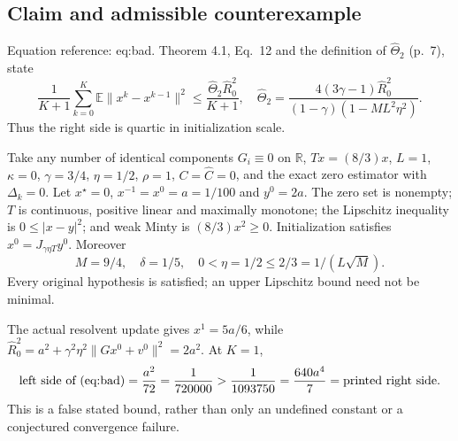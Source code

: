\documentclass[10pt]{article}
\begin{document}
\subsection*{Claim and admissible counterexample}
Equation reference: eq:bad. Theorem 4.1, Eq. 12 and the definition of \(\widehat\Theta_2\) (p. 7), state \[
 \frac1{K+1}\sum_{k=0}^K\mathbb E\|x^k-x^{k-1}\|^2
 \le\frac{\widehat\Theta_2\widehat R_0^2}{K+1},
 \quad
 \widehat\Theta_2=
 \frac{4(3\gamma-1)\widehat R_0^2}
 {(1-\gamma)(1-ML^2\eta^2)}.\] Thus the right side is quartic in initialization scale.\par
Take any number of identical components \(G_i\equiv0\) on \(\mathbb R\), \(Tx=(8/3)x\), \(L=1\), \(\kappa=0\), \(\gamma=3/4\), \(\eta=1/2\), \(\rho=1\), \(C=\widehat C=0\), and the exact zero estimator with \(\Delta_k=0\). Let \(x^\star=0\), \(x^{-1}=x^0=a=1/100\) and \(y^0=2a\). The zero set is nonempty; \(T\) is continuous, positive linear and maximally monotone; the Lipschitz inequality is \(0\le|x-y|^2\); and weak Minty is \((8/3)x^2\ge0\). Initialization satisfies \(x^0=J_{\gamma\eta T}y^0\). Moreover \[M=9/4,\quad \delta=1/5,\quad
 0<\eta=1/2\le2/3=1/(L\sqrt M).\] Every original hypothesis is satisfied; an upper Lipschitz bound need not be minimal.\par
The actual resolvent update gives \(x^1=5a/6\), while \(\widehat R_0^2=a^2+\gamma^2\eta^2\|Gx^0+v^0\|^2=2a^2\). At \(K=1\), \[\text{left side of \text{(eq:bad)}}=\frac{a^2}{72}
 =\frac1{720000}>
 \frac1{1093750}=\frac{640a^4}{7}
 =\text{printed right side}.\] This is a false stated bound, rather than only an undefined constant or a conjectured convergence failure.\par
\end{document}
